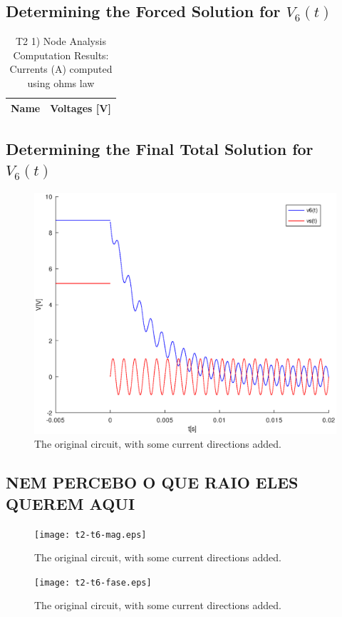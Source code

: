 \subsection{Determining the Forced Solution for $V_6(t)$}

\begin{table}[h]
  \centering
  \begin{tabular}{|l|r|}
    \hline    
    {\bf Name} & {\bf Voltages [V]} \\ \hline
    
  \end{tabular}
  \caption{T2 1) Node Analysis Computation Results: Currents (A) computed using ohms law}
  \label{tab:nodeVoltages2}
\end{table}

\subsection{Determining the Final Total Solution for $V_6(t)$}

\begin{figure}[h] \centering
\includegraphics[width=0.4\linewidth]{t2-t5.eps}
\caption{The original circuit, with some current directions added.}
\label{cfergter}
\end{figure}


\subsection{NEM PERCEBO O QUE RAIO ELES QUEREM AQUI}

\begin{figure}[h] \centering
\texttt{[image: t2-t6-mag.eps]}
\caption{The original circuit, with some current directions added.}
\label{cfergter}
\end{figure}

\begin{figure}[h] \centering
\texttt{[image: t2-t6-fase.eps]}
\caption{The original circuit, with some current directions added.}
\label{cfergter}
\end{figure}